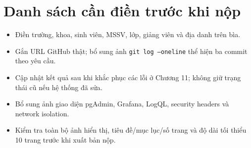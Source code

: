 \documentclass[12pt,a4paper]{report}
\begin{document}
\chapter*{Danh sách cần điền trước khi nộp}
\begin{itemize}
\item Điền trường, khoa, sinh viên, MSSV, lớp, giảng viên và địa danh trên bìa.
\item Gắn URL GitHub thật; bổ sung ảnh \texttt{git log --oneline} thể hiện ba commit theo yêu cầu.
\item Cập nhật kết quả sau khi khắc phục các lỗi ở Chương 11; không giữ trạng thái cũ nếu hệ thống đã sửa.
\item Bổ sung ảnh giao diện pgAdmin, Grafana, LogQL, security headers và network isolation.
\item Kiểm tra toàn bộ ảnh hiển thị, tiêu đề/mục lục/số trang và độ dài tối thiểu 10 trang trước khi xuất bản nộp.
\end{itemize}
\end{document}

